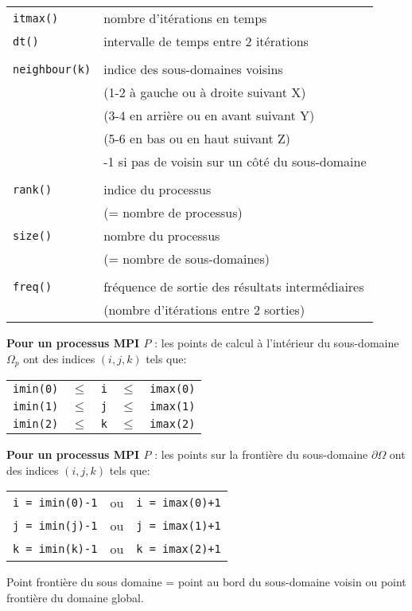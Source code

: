 \documentclass{beamer}
\begin{document}
\begin{frame}
	\begin{tabular}{ll}
		{\tt itmax()} & nombre d'itérations en temps \\
		{\tt dt()} & intervalle de temps entre 2 itérations \\ \\
		{\tt neighbour(k)} & indice des sous-domaines voisins \\
                 & (1-2 à gauche ou à droite suivant X) \\
                 & (3-4 en arrière ou en avant suivant Y) \\
                 & (5-6 en bas ou en haut suivant Z) \\ 
                 & -1 si pas de voisin sur un côté du sous-domaine \\ \\
		{\tt rank()} & indice du processus \\ & (= nombre de processus)\\
		{\tt size()} & nombre du processus \\ & (= nombre de sous-domaines) \\ \\ 
		{\tt freq()} & fréquence de sortie des résultats intermédiaires \\
		& (nombre d'itérations entre 2 sorties)
	\end{tabular}
	
\end{frame}

\begin{frame}
	
\vfill
{\bf Pour un processus MPI $P$} : les points de calcul à l'intérieur du sous-domaine $\Omega_p$ ont des indices $(i,j,k)$ tels que:
\bigskip

\begin{tabular}{lclcl}
	{\tt imin(0)} & $\leq$ & {\tt i} & $\leq$ & {\tt imax(0)} \\
	{\tt imin(1)} & $\leq$ & {\tt j} & $\leq$ & {\tt imax(1)} \\
	{\tt imin(2)} & $\leq$ & {\tt k} & $\leq$ & {\tt imax(2)} \\
\end{tabular}
\vfill

{\bf Pour un processus MPI $P$} : les points sur la frontière du sous-domaine $\partial\Omega$ ont des indices $(i,j,k)$ tels que:
\bigskip

\begin{tabular}{lcl}
	{\tt i = imin(0)-1} & ou & {\tt i = imax(0)+1}  \\
	{\tt j = imin(j)-1} & ou & {\tt j = imax(1)+1}  \\
	{\tt k = imin(k)-1} & ou & {\tt k = imax(2)+1} 
\end{tabular}

\vfill
Point frontière du sous domaine = point au bord du sous-domaine voisin ou point frontière du domaine global.
\vfill
	
	
\end{frame}
\end{document}
